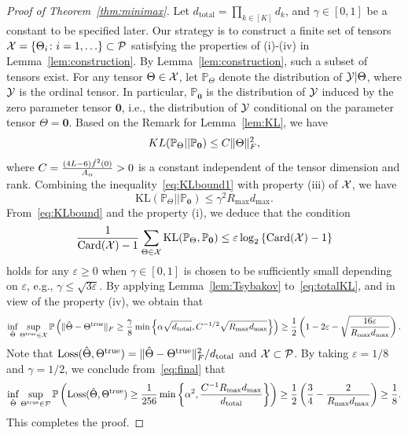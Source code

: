 \documentclass[11pt]{article}
\theoremstyle{plain}
\theoremstyle{definition}
\begin{document}
\begin{proof}[Proof of Theorem~\ref{thm:minimax}]

Let $d_{\text{total}}=\prod_{k\in[K]}d_k$, and $\gamma\in[0,1]$ be a constant to be specified later.  Our strategy is to construct a finite set of tensors $\mathcal{X}=\{\Theta_i\colon i=1,\ldots \}\subset \mathcal{P}$ satisfying the properties of (i)-(iv) in Lemma~\ref{lem:construction}. By Lemma~\ref{lem:construction}, such a subset of tensors exist. For any tensor  $\Theta\in\mathcal{X}$, let $\mathbb{P}_{\Theta}$ denote the distribution of $\mathcal{Y}|\Theta$, where $\mathcal{Y}$ is the ordinal tensor. In particular, $\mathbb{P}_{\mathbf{0}}$ is the distribution of $\mathcal{Y}$ induced by the zero parameter tensor $\mathbf{0}$, i.e., the distribution of $\mathcal{Y}$ conditional on the parameter tensor $\Theta=\mathbf{0}$. Based on the Remark for Lemma~\ref{lem:KL}, we have
\begin{equation}\label{eq:KLbound1}
KL(\mathbb{P}_{\Theta}|| \mathbb{P}_{\mathbf{0}})\leq C \lVert\Theta\rVert_F^2,
\end{equation}
where $C={(4L-6) \dot{f}^2(0)\over  A_\alpha}>0$ is a constant independent of the tensor dimension and rank.
Combining the inequality~\eqref{eq:KLbound1} with property (iii) of $\mathcal{X}$, we have
\begin{equation}\label{eq:KLbound}
\text{KL}(\mathbb{P}_{\Theta}||\mathbb{P}_{\mathbf{0}})\leq \gamma^2 R_{\max} d_{\max}.
\end{equation}
From~\eqref{eq:KLbound} and the property (i), we deduce that the condition
\begin{equation}\label{eq:totalKL}
{1\over \text{Card}(\mathcal{X})-1}\sum_{\Theta \in\mathcal{X}}\text{KL}(\mathbb{P}_{\Theta}, \mathbb{P}_{\mathbf{0}})\leq \varepsilon \log_2\left\{\text{Card}(\mathcal{X})-1 \right\}
\end{equation}
holds for any $ \varepsilon \geq 0$ when $\gamma\in[0,1]$ is chosen to be sufficiently small depending on $\varepsilon$, e.g., $\gamma \leq \sqrt{3\varepsilon}$. By applying Lemma~\ref{lem:Tsybakov} to~\eqref{eq:totalKL}, and in view of the property (iv), we obtain that
\begin{equation}\label{eq:final}
\inf_{\hat \Theta}\sup_{\Theta^{\text{true}}\in \mathcal{X}}\mathbb{P}\left(\lVert\hat \Theta- \Theta^{\text{true}}\rVert_F\geq  {\gamma\over 8} \min\left\{ \alpha\sqrt{d_{\text{total}}}, C^{-1/2}\sqrt{ R_{\max}d_{\max}}\right\} \right)\geq {1\over 2}\left(1-2\varepsilon-\sqrt{16 \varepsilon \over R_{\max}d_{\max}}\right).
\end{equation}
Note that $\text{Loss}(\hat \Theta, \Theta^{\text{true}})=\lVert\hat \Theta- \Theta^{\text{true}}\rVert_F^2/d_{\text{total}}$ and $\mathcal{X}\subset \mathcal{P}$. By taking $\varepsilon=1/8$ and $\gamma=1/2$, we conclude from~\eqref{eq:final} that
\begin{equation*}\label{eq:prob}
\inf_{\hat \Theta}\sup_{\Theta^{\text{true}}\in \mathcal{P}}\mathbb{P}\left(\text{Loss}(\hat \Theta, \Theta^{\text{true}})\geq {1 \over 256}\min\left \{ \alpha^2,  {C^{-1}R_{\max}d_{\max}\over d_{\text{total}}}\right \}\right)\geq {1\over 2}\left({3\over 4}- {2\over R_{\max}d_{\max}} \right)\geq {1\over 8}.
\end{equation*}
This completes the proof.
\end{proof}
\end{document}
